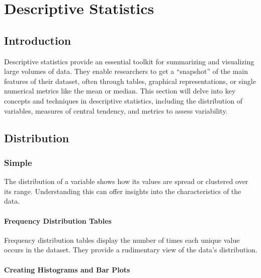 \documentclass[
  b5paper]{book}
\begin{document}
\hypertarget{descriptive-statistics-1}{%
\section{Descriptive Statistics}\label{descriptive-statistics-1}}

\hypertarget{introduction-8}{%
\subsection{Introduction}\label{introduction-8}}

Descriptive statistics provide an essential toolkit for summarizing and visualizing large volumes of data. They enable researchers to get a ``snapshot'' of the main features of their dataset, often through tables, graphical representations, or single numerical metrics like the mean or median. This section will delve into key concepts and techniques in descriptive statistics, including the distribution of variables, measures of central tendency, and metrics to assess variability.

\hypertarget{distribution}{%
\subsection{Distribution}\label{distribution}}

\hypertarget{simple}{%
\subsubsection{Simple}\label{simple}}

The distribution of a variable shows how its values are spread or clustered over its range. Understanding this can offer insights into the characteristics of the data.

\hypertarget{frequency-distribution-tables}{%
\paragraph{Frequency Distribution Tables}\label{frequency-distribution-tables}}

Frequency distribution tables display the number of times each unique value occurs in the dataset. They provide a rudimentary view of the data's distribution.

\hypertarget{creating-histograms-and-bar-plots}{%
\paragraph{Creating Histograms and Bar Plots}\label{creating-histograms-and-bar-plots}}
\end{document}
